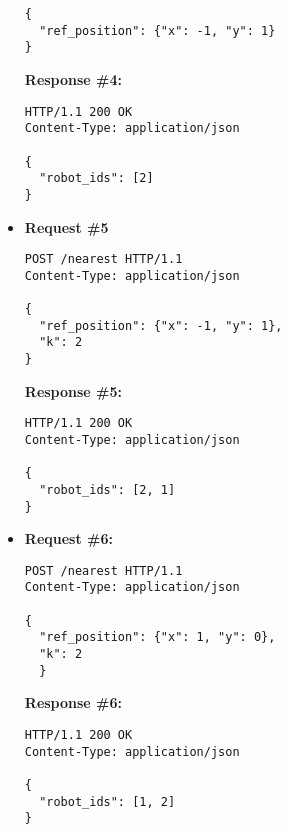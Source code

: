 \begin{itemize}
\begin{lstlisting}[xleftmargin=1pc,numbers=none]
{
  "ref_position": {"x": -1, "y": 1}
}
\end{lstlisting}
\textbf{Response \#4:}
\begin{lstlisting}[xleftmargin=1pc,numbers=none]
HTTP/1.1 200 OK
Content-Type: application/json

{
  "robot_ids": [2]
}
\end{lstlisting}

\item  %
\textbf{Request \#5}
\begin{lstlisting}[xleftmargin=1pc,numbers=none]
POST /nearest HTTP/1.1
Content-Type: application/json

{
  "ref_position": {"x": -1, "y": 1},
  "k": 2
}
\end{lstlisting}
\textbf{Response \#5:}
\begin{lstlisting}[xleftmargin=1pc,numbers=none]
HTTP/1.1 200 OK
Content-Type: application/json

{
  "robot_ids": [2, 1]
}
\end{lstlisting}

\newpage
\item  %
\textbf{Request \#6:}
\begin{lstlisting}[xleftmargin=1pc,numbers=none]
POST /nearest HTTP/1.1
Content-Type: application/json

{
  "ref_position": {"x": 1, "y": 0},
  "k": 2
  }
\end{lstlisting}
\textbf{Response \#6:}
\begin{lstlisting}[xleftmargin=1pc,numbers=none]
HTTP/1.1 200 OK
Content-Type: application/json

{
  "robot_ids": [1, 2]
}
\end{lstlisting}
\end{itemize}
